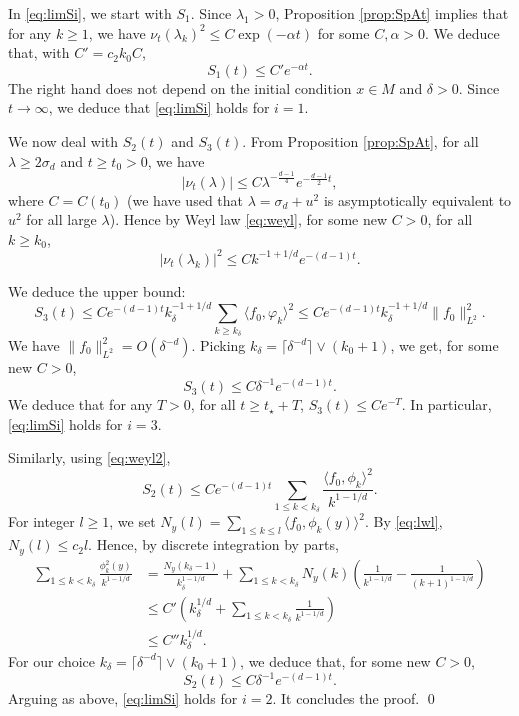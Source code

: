 \documentclass[]{scrartcl}
\numberwithin{equation}{section}
\numberwithin{figure}{section}
\begin{document}
In \eqref{eq:limSi}, we start with $S_1$.  Since $\lambda_1 > 0$,  Proposition \ref{prop:SpAt} implies that for any $k \geq 1$, we have $\nu_t (\lambda_k)^2  \leq C \exp ( -  \alpha t)$ for some $C,\alpha >0$. We deduce that, with $C' = c_2 k_0 C$,
$$
S_{1}(t) \leq C' e^{- \alpha t}.
$$
The right hand does not depend on the initial condition $x \in M$ and $\delta > 0$. Since $t \to \infty$, we deduce that \eqref{eq:limSi} holds for $i =1$.



We now deal with $S_2(t)$ and $S_3(t)$. From Proposition \ref{prop:SpAt},  for all $\lambda \geq 2 \sigma_d$ and $t \geq t_0  >0 $, we have 
$$
| \nu_t (\lambda) | \leq   C  \lambda^{-\frac{d-1} 4} e^{- \frac{d-1}{2} t },
$$
where $C = C(t_0)$ (we have used that $\lambda = \sigma_d + u^2$ is asymptotically equivalent to $u^2$ for all large $\lambda$). Hence by Weyl law \eqref{eq:weyl}, for some new $C >0$, for all $k \geq k_0$, 
\begin{equation}\label{eq:weyl2}
| \nu_t (\lambda_k) |^2 \leq   C  k^{- 1 + 1/d} e^{- (d-1) t }.
\end{equation}

We deduce the upper bound: 
$$
S_{3}(t)  \leq  C e^{- (d-1) t}  k_\delta^{- 1 + 1/d} \sum_{k \geq k_\delta} \langle f_0 , \varphi_k \rangle^2 \leq C e^{- (d-1) t}  k_\delta^{- 1 + 1/d} \| f_0 \|^2_{L^2} .
$$
We have $\| f_0 \|^2_{L^2}  = O(\delta^{-d})$. Picking $k_\delta = \lceil \delta^{-d} \rceil \vee (k_0+1)$, we get, for some new $C >0$, 
$$
S_{3}(t)  \leq C \delta^{-1} e^{- (d-1) t}.
$$
We deduce that for any $T > 0$, for all $t \geq t_\star + T$, 
$S_{3}(t) \leq C e^{- T}$.   In particular, \eqref{eq:limSi} holds for $i =3$.



Similarly, using  \eqref{eq:weyl2}, 
$$
S_{2} (t) \leq C e^{- (d-1) t} \sum_{ 1 \leq k <  k_\delta} \frac{ \langle f_0 , \phi_k \rangle^2 }{k^{1 - 1/d}}. 
$$
For integer $l \geq 1$, we set $N_y (l) = \sum_{1 \leq k \leq l } \langle f_0 , \phi_k(y) \rangle^2$. By \eqref{eq:lwl}, $N_y (l) \leq c_2 l$. Hence, by discrete integration by parts,
\begin{align*}
\sum_{ 1 \leq k < k_\delta} \frac{\phi^2_k(y) }{k^{1 - 1/d}} & =  \frac{N_y(k_\delta-1)}{k_\delta^{1-1/d}} + \sum_{1 \leq k < k_\delta} N_y(k) \left(\frac{1}{k^{1-1/d}} - \frac{1}{(k+1)^{1-1/d}}\right) \\
& \leq  C' \left( k_\delta^{1/d} + \sum_{1 \leq k < k_\delta}  \frac{1}{k^{1-1/d}} \right) \\
& \leq C''k_\delta^{1/d}. 
\end{align*}
For our choice  $k_\delta = \lceil \delta^{-d} \rceil \vee (k_0+1)$, we deduce that, for some new $C >0$, 
$$
S_2 (t) \leq C \delta^{-1} e^{- (d-1) t}.
$$
Arguing as above,  \eqref{eq:limSi} holds for $i =2$. It concludes the proof.
\qed
\end{document}
